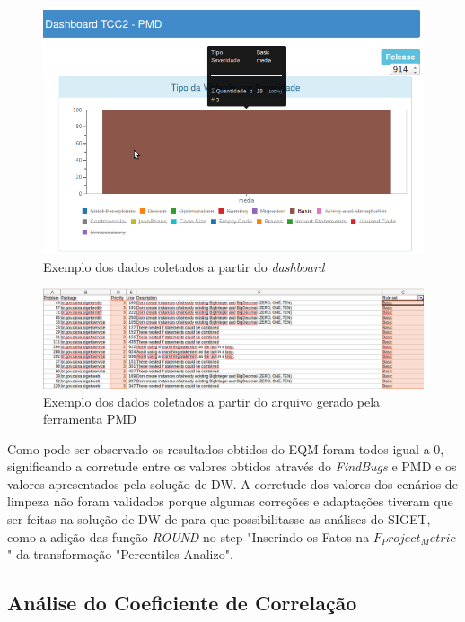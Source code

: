 \begin{figure}[h!]
\centering
\includegraphics[keepaspectratio=false,scale=0.55]{figuras/figuras_nilton/comparacaodash1.png}
\caption{Exemplo dos dados coletados a partir do \textit{dashboard}}
\label{comparacaodash}
\end{figure}

\begin{figure}[h!]
\centering
\includegraphics[keepaspectratio=false,scale=0.4]{figuras/figuras_nilton/comparacaoexcell.png}
\caption{Exemplo dos dados coletados a partir do arquivo gerado pela ferramenta PMD}
\label{comparacaoexcell}
\end{figure}

Como pode ser observado os resultados obtidos do EQM foram todos igual a 0, significando a corretude entre os valores obtidos através do \textit{FindBugs} e PMD e os valores apresentados pela solução de DW. A corretude dos valores dos cenários de limpeza não foram validados porque algumas correções e adaptações tiveram que ser feitas na solução de DW de \cite{rego_monitoramento_2014TCC} para que possibilitasse as análises do SIGET, como a adição das função \textit{ROUND} no step "Inserindo os Fatos na $F_Project_Metric $" da transformação "Percentiles Analizo".  


\subsection{Análise do Coeficiente de Correlação}

